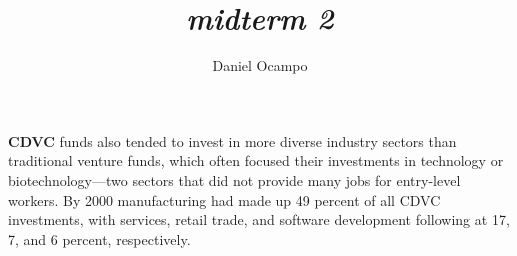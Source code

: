 \documentclass{article}
\title{\emph{ midterm 2 \\
             }}
\author{Daniel Ocampo}
\begin{document}
\maketitle 
\linespread{1.0}\selectfont

\textbf{CDVC} funds also tended to invest in more diverse industry sectors than
traditional venture funds, which often focused their investments in
technology or biotechnology—two sectors that did not provide
many jobs for entry-level workers. By 2000 manufacturing had
made up 49 percent of all CDVC investments, with services, retail
trade, and software development following at 17, 7, and 6 percent,
respectively.
\end{document}
